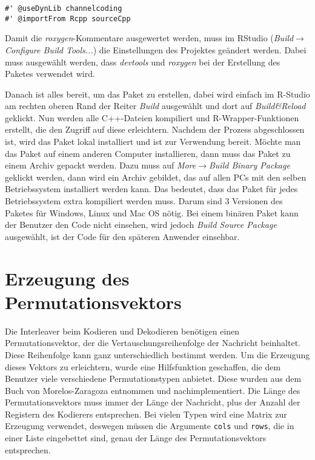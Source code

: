 \begin{lstlisting}[caption=Nötige \emph{roxygen}-Kommentare bei der Verwendung von C++-Code, label={lst:rcppNamespace}, float=!th]
#' @useDynLib channelcoding
#' @importFrom Rcpp sourceCpp
\end{lstlisting}

Damit die \emph{roxygen}-Kommentare ausgewertet werden, muss im RStudio (\emph{Build$\rightarrow$Configure Build Tools...}) die Einstellungen des Projektes geändert werden. Dabei muss ausgewählt werden, dass \emph{devtools} und \emph{roxygen} bei der Erstellung des Paketes verwendet wird.

Danach ist alles bereit, um das Paket zu erstellen, dabei wird einfach im R-Studio am rechten oberen Rand der Reiter \emph{Build} ausgewählt und dort auf \emph{Build\&Reload} geklickt. Nun werden alle C++-Dateien kompiliert und R-Wrapper-Funktionen erstellt, die den Zugriff auf diese erleichtern. Nachdem der Prozess abgeschlossen ist, wird das Paket lokal installiert und ist zur Verwendung bereit. Möchte man das Paket auf einem anderen Computer installieren, dann muss das Paket zu einem Archiv gepackt werden. Dazu muss auf \emph{More$\rightarrow$Build Binary Package} geklickt werden, dann wird ein Archiv gebildet, das auf allen PCs mit den selben Betriebssystem installiert werden kann. Das bedeutet, dass das Paket für jedes Betriebssystem extra kompiliert werden muss. Darum sind 3 Versionen des Paketes für Windows, Linux und Mac OS nötig. Bei einem binären Paket kann der Benutzer den Code nicht einsehen, wird jedoch \emph{Build Source Package} ausgewählt, ist der Code für den späteren Anwender einsehbar.   

\section{Erzeugung des Permutationsvektors}
\label{sec:implementation_permutation}
Die Interleaver beim Kodieren und Dekodieren benötigen einen Permutationsvektor, der die Vertauschungsreihenfolge der Nachricht beinhaltet. Diese Reihenfolge kann ganz unterschiedlich bestimmt werden. Um die Erzeugung dieses Vektors zu erleichtern, wurde eine Hilfsfunktion geschaffen, die dem Benutzer viele verschiedene Permutationstypen anbietet. Diese wurden aus dem Buch von Morelos-Zaragoza \cite{morelos2006art} entnommen und nachimplementiert. Die Länge des Permutationsvektors muss immer der Länge der Nachricht, plus der Anzahl der Registern des Kodierers entsprechen. Bei vielen Typen wird eine Matrix zur Erzeugung verwendet, deswegen müssen die Argumente \texttt{cols} und \texttt{rows}, die in einer Liste eingebettet sind, genau der Länge des Permutationsvektors entsprechen.

